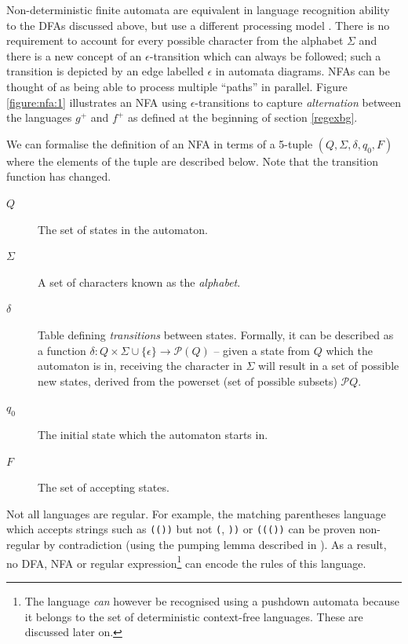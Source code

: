 \documentclass[a4paper,openany,12pt]{book}
\begin{document}
Non-deterministic finite automata are equivalent in language recognition ability to the DFAs discussed above, but use a
different processing model \citep[p.~46]{sipser2012introduction}.
There is no requirement to account for every possible character from the alphabet $\Sigma$ and there is a new concept of
an $\epsilon$-transition which can always be followed; such a transition is depicted by an edge labelled $\epsilon$ in
automata diagrams.
NFAs can be thought of as being able to process multiple ``paths'' in parallel.
Figure \ref{figure:nfa:1} illustrates an NFA using $\epsilon$-transitions to capture \emph{alternation} between the
languages $g^+$ and $f^+$ as defined at the beginning of section \ref{regexbg}.

We can formalise the definition of an NFA in terms of a 5-tuple $(Q, \Sigma, \delta, q_0, F)$ where the elements of the
tuple are described below.
Note that the transition function has changed.

\begin{description}
\item[$Q$] The set of states in the automaton.
\item[$\Sigma$] A set of characters known as the \emph{alphabet}.
\item[$\delta$] Table defining \emph{transitions} between states. Formally, it can be described as a function
                $\delta : Q \times \Sigma \cup \{\epsilon\} \rightarrow \mathcal{P}(Q)$ -- given a state from $Q$ which
                the automaton is in, receiving the character in $\Sigma$ will result in a set of possible new states,
                derived from the powerset (set of possible subsets) $\mathcal{P}Q$.
\item[$q_0$] The initial state which the automaton starts in.
\item[$F$] The set of accepting states.
\end{description}

Not all languages are regular.
For example, the matching parentheses language which accepts strings such as \texttt{(())} but not \texttt{(},
\texttt{))} or \texttt{((())} can be proven non-regular by contradiction (using the pumping lemma described in
\citet{rabin1959finite}).
As a result, no DFA, NFA or regular expression\footnote{The language \emph{can} however be recognised using a pushdown
automata because it belongs to the set of deterministic context-free languages. These are discussed later on.} can encode the rules of this language.
\end{document}
